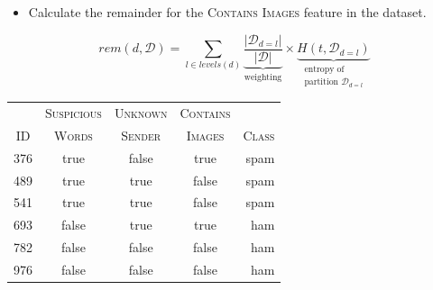 \documentclass[xcolor={table}]{beamer}
\newcommand{\featN}[1]{\textsc{#1}}
\begin{document}
\begin{frame}
	\begin{itemize}
		\item Calculate the \alert{remainder} for the \featN{Contains Images} feature in the dataset.
	\end{itemize}
\begin{equation*}
rem\left(d,\mathcal{D}\right) = 
\sum_{l \in levels\left(d\right)} 
\underbrace{
\frac{|\mathcal{D}_{d=l}|}{|\mathcal{D}|}}_{\text{weighting}} \times
 \underbrace{H\left(t, \mathcal{D}_{d=l}\right)}_{
	\substack{
		\text{entropy of}\\
		\text{partition }\mathcal{D}_{d=l}
	}
}
\end{equation*}
	\begin{table}[!hbt]
\centering
\begin{footnotesize}
\begin{tabular}{ccccr}
\hline
	 & \featN{Suspicious}	& \featN{Unknown}	 & \featN{Contains}	 & \featN{} \\
\featN{ID}	 & \featN{Words}	& \featN{Sender}	 & \featN{Images}	 & \featN{Class} \\
\hline
376	 & true	 & false 	 & true	& spam \\
489	 & true	 & true 	 & false	& spam \\
541	 & true	 & true 	 & false	& spam \\
693	 & false	 & true 	 & true	& ham \\
782	 & false	 & false 	 & false	& ham \\
976	 & false	 & false 	 & false	& ham \\
\hline
\end{tabular}
\end{footnotesize}
\end{table}
\end{frame}
\end{document}
